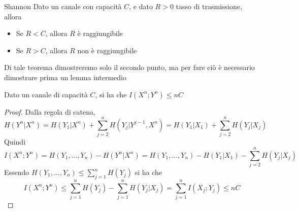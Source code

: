 \begin{theorem}[namedlabel={{thm:shannon_2}}{Shannon}]{Shannon}
  Dato un canale con capacità \(C\), e dato \(R>0\) tasso di trasmissione, allora
  \begin{itemize}
    \item Se \(R < C\), allora \(R\) è raggiungibile
    \item Se \(R > C\), allora \(R\) non è raggiungibile
  \end{itemize}
\end{theorem}

Di tale teorema dimostreremo solo il secondo punto, ma per fare ciò è necessario dimostrare prima un lemma intermedio

\begin{lemma}{}
  Dato un canale di capacità \(C\), si ha che
  \(I(X^n;Y^n)\leq n C\)
\end{lemma}
\begin{proof}
  Dalla regola di catena,
  \[H(Y^n|X^n) = H(Y_1|X^n) + \sum_{j=2}^n H(Y_j|Y^{j-1},X^n) = H(Y_1|X_1) + \sum_{j=2}^n H(Y_j|X_j)\]
  Quindi
  \[I(X^n;Y^n) = H(Y_1,\ldots,Y_n) - H(Y^n|X^n) = H(Y_1, \ldots, Y_n) - H(Y_1|X_1) - \sum_{j=2}^n H(Y_j|X_j)\]
  Essendo \(H(Y_1,\ldots, Y_n) \leq \sum_{j=1}^n H(Y_j)\) si ha che
  \[I(X^n;Y^n) \leq \sum_{j=1}^n H(Y_j) - \sum_{j=1}^n H(Y_j|X_j) = \sum_{j=1}^n I(X_j;Y_j) \leq n C\]
  
\end{proof}

